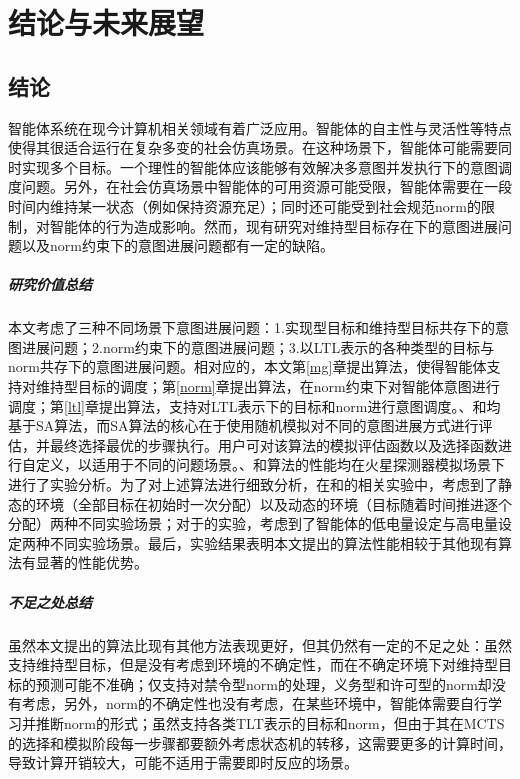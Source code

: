 \chapter{结论与未来展望}
\section{结论}
智能体系统在现今计算机相关领域有着广泛应用。智能体的自主性与灵活性等特点使得其很适合运行在复杂多变的社会仿真场景。在这种场景下，智能体可能需要同时实现多个目标。一个理性的智能体应该能够有效解决多意图并发执行下的意图调度问题。另外，在社会仿真场景中智能体的可用资源可能受限，智能体需要在一段时间内维持某一状态（例如保持资源充足）；同时还可能受到社会规范norm的限制，对智能体的行为造成影响。然而，现有研究对维持型目标存在下的意图进展问题以及norm约束下的意图进展问题都有一定的缺陷。
\paragraph{研究价值总结}
本文考虑了三种不同场景下意图进展问题：1.实现型目标和维持型目标共存下的意图进展问题；2.norm约束下的意图进展问题；3.以LTL表示的各种类型的目标与norm共存下的意图进展问题。相对应的，本文第\ref{mg}章提出\SAM 算法，使得智能体支持对维持型目标的调度；第\ref{norm}章提出\SAN 算法，在norm约束下对智能体意图进行调度；第\ref{ltl}章提出\SAT 算法，支持对LTL表示下的目标和norm进行意图调度。\SAM 、\SAN 和\SAT 均基于SA算法，而SA算法的核心在于使用随机模拟对不同的意图进展方式进行评估，并最终选择最优的步骤执行。用户可对该算法的模拟评估函数以及选择函数进行自定义，以适用于不同的问题场景。\SAM 、\SAN 和\SAT 算法的性能均在火星探测器模拟场景下进行了实验分析。为了对上述算法进行细致分析，在\SAM 和\SAN 的相关实验中，考虑到了静态的环境（全部目标在初始时一次分配）以及动态的环境（目标随着时间推进逐个分配）两种不同实验场景；对于\SAT 的实验，考虑到了智能体的低电量设定与高电量设定两种不同实验场景。最后，实验结果表明本文提出的算法性能相较于其他现有算法有显著的性能优势。
\paragraph{不足之处总结}
虽然本文提出的算法比现有其他方法表现更好，但其仍然有一定的不足之处：\SAM 虽然支持维持型目标，但是没有考虑到环境的不确定性，而在不确定环境下\SAM 对维持型目标的预测可能不准确；\SAN 仅支持对禁令型norm的处理，义务型和许可型的norm却没有考虑，另外，norm的不确定性也没有考虑，在某些环境中，智能体需要自行学习并推断norm的形式；\SAT 虽然支持各类TLT表示的目标和norm，但由于其在MCTS的选择和模拟阶段每一步骤都要额外考虑状态机的转移，这需要更多的计算时间，导致计算开销较大，可能不适用于需要即时反应的场景。
